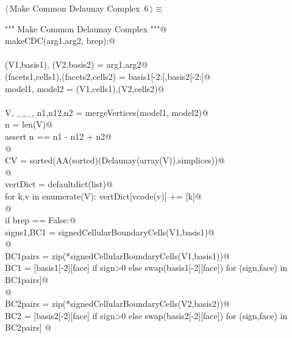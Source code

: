 \documentclass[11pt,oneside]{article}	%
\begin{document}
	
\begin{flushleft} \small \label{scrap4}
\protect{}$\langle\,$Make Common Delaunay Complex\nobreak\ {\footnotesize 6}$\,\rangle\equiv$
\vspace{-1ex}
\begin{list}{}{} \item
\mbox{}\verb@""" Make Common Delaunay Complex """@\\
\mbox{}\verb@def makeCDC(arg1,arg2, brep):@\\
\mbox{}\verb@@\\
\mbox{}\verb@   (V1,basis1), (V2,basis2) = arg1,arg2@\\
\mbox{}\verb@   (facets1,cells1),(facets2,cells2) = basis1[-2:],basis2[-2:]@\\
\mbox{}\verb@   model1, model2 = (V1,cells1),(V2,cells2)@\\
\mbox{}\verb@@\\
\mbox{}\verb@   V, _,_, n1,n12,n2 = mergeVertices(model1, model2)@\\
\mbox{}\verb@   n = len(V)@\\
\mbox{}\verb@   assert n == n1 - n12 + n2@\\
\mbox{}\verb@   @\\
\mbox{}\verb@   CV = sorted(AA(sorted)(Delaunay(array(V)).simplices))@\\
\mbox{}\verb@   @\\
\mbox{}\verb@   vertDict = defaultdict(list)@\\
\mbox{}\verb@   for k,v in enumerate(V): vertDict[vcode(v)] += [k]@\\
\mbox{}\verb@   @\\
\mbox{}\verb@   if brep == False:@\\
\mbox{}\verb@      signs1,BC1 = signedCellularBoundaryCells(V1,basis1)@\\
\mbox{}\verb@      @\\
\mbox{}\verb@      BC1pairs = zip(*signedCellularBoundaryCells(V1,basis1))@\\
\mbox{}\verb@      BC1 = [basis1[-2][face] if sign>0 else swap(basis1[-2][face]) for (sign,face) in BC1pairs]@\\
\mbox{}\verb@    @\\
\mbox{}\verb@      BC2pairs = zip(*signedCellularBoundaryCells(V2,basis2))@\\
\mbox{}\verb@      BC2 = [basis2[-2][face] if sign>0 else swap(basis2[-2][face]) for (sign,face) in BC2pairs] @\\

\end{list}
\end{flushleft}
\end{document}

